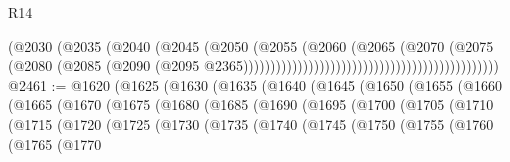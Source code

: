 \begin{lexlean}{R14}
\begin{coremodule}
{{{{{{{{{{{{{{{{{{{{{{{{{{{{{{{{{{{{{{{{{{{{{{{{{{{{{{{{{{{{{{{{{{{{{{{{{{{{{{{{{{{{{{{{{{{{{{{{{{{{{{{{{{                                                                      (@2030
                                                                        (@2035
                                                                          (@2040
                                                                            (@2045
                                                                              (@2050
                                                                                (@2055
                                                                                  (@2060
                                                                                    (@2065
                                                                                      (@2070
                                                                                        (@2075
                                                                                          (@2080
                                                                                            (@2085
                                                                                              (@2090
                                                                                                (@2095
                                                                                                  @2365)))))))))))))))))))))))))))))))))))))))))))))))
@2461 := @1620
    (@1625
      (@1630
        (@1635
          (@1640
            (@1645
              (@1650
                (@1655
                  (@1660
                    (@1665
                      (@1670
                        (@1675
                          (@1680
                            (@1685
                              (@1690
                                (@1695
                                  (@1700
                                    (@1705
                                      (@1710
                                        (@1715
                                          (@1720
                                            (@1725
                                              (@1730
                                                (@1735
                                                  (@1740
                                                    (@1745
                                                      (@1750
                                                        (@1755
                                                          (@1760
                                                            (@1765
                                                              (@1770
}}}}}}}}}}}}}}}}}}}}}}}}}}}}}}}}}}}}}}}}}}}}}}}}}}}}}}}}}}}}}}}}}}}}}}}}}}}}}}}}}}}}}}}}}}}}}}}}}}}}}}}}}}
\end{coremodule}
\end{lexlean}
